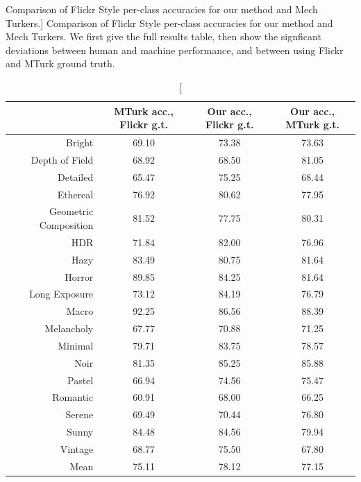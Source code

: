 \begin{table}[ht!]
\caption
[Comparison of Flickr Style per-class accuracies for our method and Mech Turkers.]
{
Comparison of Flickr Style per-class accuracies for our method and Mech Turkers.
We first give the full results table, then show the signficant deviations between human and machine performance, and between using Flickr and MTurk ground truth.
}\label{tab:flickr_vs_mturk}
\vspace{1em}
\centering
\small{
\begin{tabular}{rccc}
\toprule
{}                    & MTurk acc., Flickr g.t. & Our acc., Flickr g.t. & Our acc., MTurk g.t. \\
\midrule
Bright                & 69.10                       & 73.38                     & 73.63 \\
Depth of Field        & 68.92                       & 68.50                     & 81.05 \\
Detailed              & 65.47                       & 75.25                     & 68.44 \\
Ethereal              & 76.92                       & 80.62                     & 77.95 \\
Geometric Composition & 81.52                       & 77.75                     & 80.31 \\
HDR                   & 71.84                       & 82.00                     & 76.96 \\
Hazy                  & 83.49                       & 80.75                     & 81.64 \\
Horror                & 89.85                       & 84.25                     & 81.64 \\
Long Exposure         & 73.12                       & 84.19                     & 76.79 \\
Macro                 & 92.25                       & 86.56                     & 88.39 \\
Melancholy            & 67.77                       & 70.88                     & 71.25 \\
Minimal               & 79.71                       & 83.75                     & 78.57 \\
Noir                  & 81.35                       & 85.25                     & 85.88 \\
Pastel                & 66.94                       & 74.56                     & 75.47 \\
Romantic              & 60.91                       & 68.00                     & 66.25 \\
Serene                & 69.49                       & 70.44                     & 76.80 \\
Sunny                 & 84.48                       & 84.56                     & 79.94 \\
Vintage               & 68.77                       & 75.50                     & 67.80 \\
\midrule
Mean                  & 75.11                       & 78.12                     & 77.15 \\
\end{tabular}

}
\end{table}
